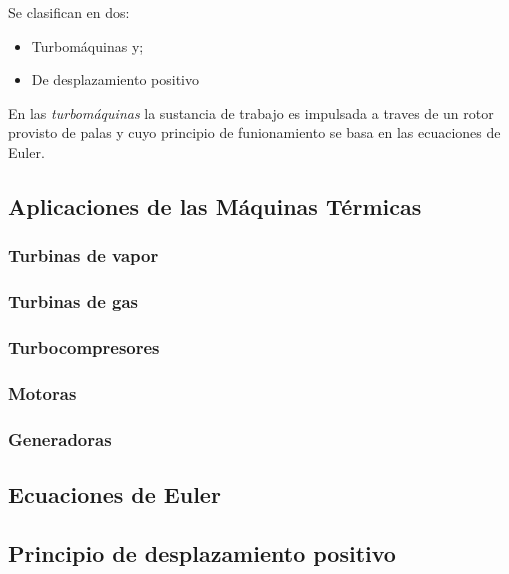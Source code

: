 Se clasifican en dos: 
\begin{itemize}
	\item Turbomáquinas y;
	\item De desplazamiento positivo
\end{itemize}

En las \textsl{turbomáquinas} la sustancia de trabajo es impulsada a traves de un rotor provisto de palas y cuyo principio de funionamiento se basa en las ecuaciones de Euler. 	

\subsection{Aplicaciones de las Máquinas Térmicas}
\subsubsection{Turbinas de vapor}
\subsubsection{Turbinas de gas}
\subsubsection{Turbocompresores}
\subsubsection{Motoras}
\subsubsection{Generadoras}

\subsection{Ecuaciones de Euler}
\subsection{Principio de desplazamiento positivo}
\lipsum[2]